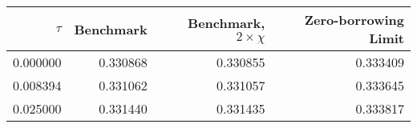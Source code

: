 \begin{tabular}{rrrr}
\toprule
   $\tau$ &  Benchmark &  Benchmark, $2 \times \chi$ &  Zero-borrowing Limit \\
\midrule
 0.000000 &   0.330868 &                    0.330855 &              0.333409 \\
 0.008394 &   0.331062 &                    0.331057 &              0.333645 \\
 0.025000 &   0.331440 &                    0.331435 &              0.333817 \\
\bottomrule
\end{tabular}
